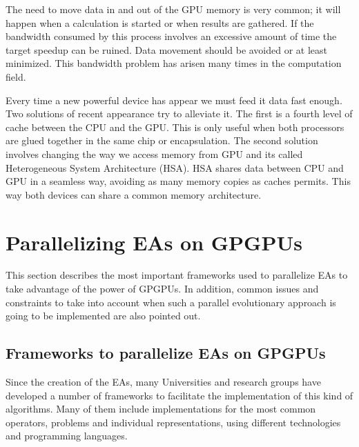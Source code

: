\documentclass{article}
\begin{document}
The need to move data in and out of the GPU memory is very common; it
will happen when a calculation is started or when results are
gathered. If the bandwidth consumed by this process involves an
excessive amount of time the target speedup can be ruined. Data
movement should be avoided or at least minimized. This bandwidth
problem has arisen many times in the computation field. 

Every time a new powerful device has appear we must feed it  data fast enough. Two solutions of recent appearance try to alleviate it. The first is a
fourth level of cache between the CPU and the GPU. %
This is only useful
when both processors are glued together in the same chip or
encapsulation. The second solution involves changing the way we access
memory from GPU and its called Heterogeneous System Architecture
(HSA). %
HSA shares data between CPU and GPU in a seamless way, avoiding
as many memory copies as caches permits. This way both devices can
share a common memory architecture.


\section{Parallelizing EAs on GPGPUs}
\label{sec:parallelizing}

This section describes the most important frameworks used to
parallelize EAs to take advantage of the power of GPGPUs. In addition,
common issues and constraints to take into account when such a
parallel evolutionary approach is going to be implemented are also
pointed out. 

\subsection{Frameworks to parallelize EAs on GPGPUs}

Since the creation of the EAs, many Universities and research groups have developed a number of frameworks to facilitate the implementation of this kind of algorithms. Many of them include implementations for the most common operators, problems and individual representations, using different technologies and programming languages.
\end{document}
